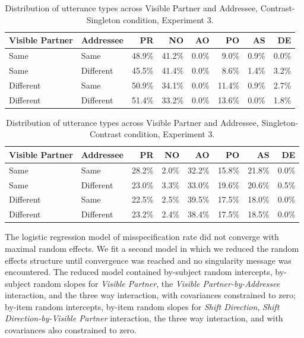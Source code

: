 \documentclass[natbib,doc,a4paper]{apa6}
\begin{document}
\begin{table}[ht]
\centering
\caption{Distribution of utterance types across Visible Partner and Addressee, Contrast-Singleton condition, Experiment 3.} 
\label{tbl:exp3-utt-dist}
\begin{tabular}{llrrrrrr}
  \hline
Visible Partner & Addressee & PR & NO & AO & PO & AS & DE \\ 
  \hline
Same & Same & 48.9\% & 41.2\% & 0.0\% & 9.0\% & 0.9\% & 0.0\% \\ 
  Same & Different & 45.5\% & 41.4\% & 0.0\% & 8.6\% & 1.4\% & 3.2\% \\ 
  Different & Same & 50.9\% & 34.1\% & 0.0\% & 11.4\% & 0.9\% & 2.7\% \\ 
  Different & Different & 51.4\% & 33.2\% & 0.0\% & 13.6\% & 0.0\% & 1.8\% \\ 
   \hline
\end{tabular}
\end{table}

\begin{table}[ht]
\centering
\caption{Distribution of utterance types across Visible Partner and Addressee, Singleton-Contrast condition, Experiment 3.} 
\label{tbl:exp3-utt-dist}
\begin{tabular}{llrrrrrr}
  \hline
Visible Partner & Addressee & PR & NO & AO & PO & AS & DE \\ 
  \hline
Same & Same & 28.2\% & 2.0\% & 32.2\% & 15.8\% & 21.8\% & 0.0\% \\ 
  Same & Different & 23.0\% & 3.3\% & 33.0\% & 19.6\% & 20.6\% & 0.5\% \\ 
  Different & Same & 22.5\% & 2.5\% & 39.5\% & 17.5\% & 18.0\% & 0.0\% \\ 
  Different & Different & 23.2\% & 2.4\% & 38.4\% & 17.5\% & 18.5\% & 0.0\% \\ 
   \hline
\end{tabular}
\end{table}

The logistic regression model of misspecification rate did not converge with  maximal random effects. We fit a second model in which we reduced the random effects structure until convergence was reached and no singularity message was encountered. The reduced model contained by-subject random intercepts, by-subject random slopes for \emph{Visible Partner}, the \emph{Visible Partner-by-Addressee} interaction, and the three way interaction, with covariances constrained to zero; by-item random intercepts, by-item random slopes for \emph{Shift Direction}, \emph{Shift Direction-by-Visible Partner} interaction, the three way interaction, and with covariances also constrained to zero.
\end{document}
